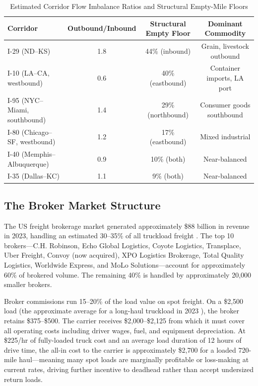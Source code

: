 \begin{table}[h]
\centering
\caption{Estimated Corridor Flow Imbalance Ratios and Structural Empty-Mile Floors}
\label{tab:imbalance}
\begin{tabular}{lccc}
\toprule
Corridor & Outbound/Inbound & Structural Empty Floor & Dominant Commodity \\
\midrule
I-29 (ND--KS) & 1.8 & 44\% (inbound) & Grain, livestock outbound \\
I-10 (LA--CA, westbound) & 0.6 & 40\% (eastbound) & Container imports, LA port \\
I-95 (NYC--Miami, southbound) & 1.4 & 29\% (northbound) & Consumer goods southbound \\
I-80 (Chicago--SF, westbound) & 1.2 & 17\% (eastbound) & Mixed industrial \\
I-40 (Memphis--Albuquerque) & 0.9 & 10\% (both) & Near-balanced \\
I-35 (Dallas--KC) & 1.1 & 9\% (both) & Near-balanced \\
\bottomrule
\end{tabular}
\end{table}

\subsection{The Broker Market Structure}

The US freight brokerage market generated approximately \$88 billion in revenue in 2023, handling an estimated 30--35\% of all truckload freight \citep{FHWA_freight2023}. The top 10 brokers---C.H. Robinson, Echo Global Logistics, Coyote Logistics, Transplace, Uber Freight, Convoy (now acquired), XPO Logistics Brokerage, Total Quality Logistics, Worldwide Express, and MoLo Solutions---account for approximately 60\% of brokered volume. The remaining 40\% is handled by approximately 20,000 smaller brokers.

Broker commissions run 15--20\% of the load value on spot freight. On a \$2,500 load (the approximate average for a long-haul truckload in 2023 \citep{DAT_spotrates2023}), the broker retains \$375--\$500. The carrier receives \$2,000--\$2,125 from which it must cover all operating costs including driver wages, fuel, and equipment depreciation. At \$225/hr of fully-loaded truck cost \citep{ATRI_costs2024} and an average load duration of 12 hours of drive time, the all-in cost to the carrier is approximately \$2,700 for a loaded 720-mile haul---meaning many spot loads are marginally profitable or loss-making at current rates, driving further incentive to deadhead rather than accept undersized return loads.

